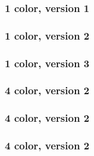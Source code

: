 \documentclass{beamer}
\begin{document}
\begin{frame}
\frametitle{1 color, version 1}

\end{frame}

\begin{frame}
\frametitle{1 color, version 2}
  
\end{frame}

\begin{frame}
\frametitle{1 color, version 3}
  
\end{frame}

\begin{frame}
\frametitle{4 color, version 2}
  
\end{frame}

\begin{frame}
\frametitle{4 color, version 2}
  
\end{frame}

\begin{frame}
\frametitle{4 color, version 2}
  
\end{frame}
\end{document}
